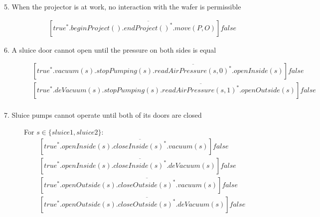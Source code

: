 \begin{description}
 
 \item[5. When the projector is at work, no interaction with the wafer is permissible]
 	\begin{align*}
 		&[true^*.beginProject().\overline{endProject()^*}.move(P,O)]false
	\end{align*}
	
 \item[6. A sluice door cannot open until the pressure on both sides is equal]
	\begin{align*}
		&[true^*.vacuum(s).stopPumping(s).\overline{readAirPressure(s,0)^*}.openInside(s)]false \\
		&[true^*.deVacuum(s).stopPumping(s).\overline{readAirPressure(s,1)^*}.openOutside(s)]false \\
	\end{align*}
	
 \item[7. Sluice pumps cannot operate until both of its doors are closed]
 
  For $s \in \{sluice1, sluice2\}:$
 \begin{align*}
		&[true^*.openInside(s).\overline{closeInside(s)^*}.vacuum(s)]false \\
		&[true^*.openInside(s).\overline{closeInside(s)^*}.deVacuum(s)]false \\
		&[true^*.openOutside(s).\overline{closeOutside(s)^*}.vacuum(s)]false \\
		&[true^*.openOutside(s).\overline{closeOutside(s)^*}.deVacuum(s)]false \\
	\end{align*}


\end{description}
